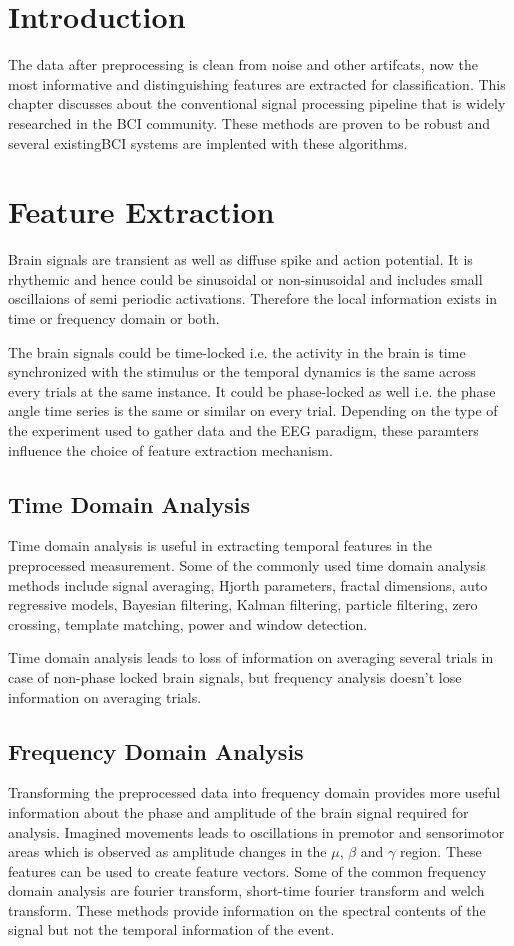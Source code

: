 \section*{Introduction}
The data after preprocessing is clean from noise and other artifcats, now the most informative and distinguishing features are extracted for classification. This chapter discusses about the conventional signal processing pipeline that is widely researched in the BCI community. These methods are proven to be robust and several existingBCI systems are implented with these algorithms.

\section{Feature Extraction}
Brain signals are transient as well as diffuse spike and action potential. It is rhythemic and hence could be sinusoidal or non-sinusoidal and includes small oscillaions of semi periodic activations. Therefore the local information exists in time or frequency domain or both. \par

The brain signals could be time-locked i.e. the activity in the brain is time synchronized with the stimulus or the temporal dynamics is the same across every trials at the same instance. It could be phase-locked as well i.e. the phase angle time series is the same or similar on every trial. Depending on the type of the experiment used to gather data and the EEG paradigm, these paramters influence the choice of feature extraction mechanism. 

\subsection{Time Domain Analysis}
Time domain analysis is useful in extracting temporal features in the preprocessed measurement. Some of the commonly used time domain analysis methods include signal averaging, Hjorth parameters, fractal dimensions, auto regressive models, Bayesian filtering, Kalman filtering, particle filtering, zero crossing, template matching, power and window detection.\par

Time domain analysis leads to loss of information on averaging several trials in case of non-phase locked brain signals, but frequency analysis doesn't lose information on averaging trials.

\subsection{Frequency Domain Analysis}
Transforming the preprocessed data into frequency domain provides more useful information about the phase and amplitude of the brain signal required for analysis. Imagined movements leads to oscillations in premotor and sensorimotor areas which is observed as amplitude changes in the $\mu$, $\beta$ and $\gamma$ region. These features can be used to create feature vectors. Some of the common frequency domain analysis are fourier transform, short-time fourier transform and welch transform. These methods provide information on the spectral contents of the signal but not the temporal information of the event. 

